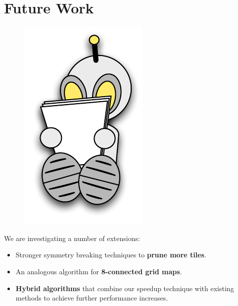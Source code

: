 \section{Future Work}
 \begin{figure}
	\vspace{-2em}
		\includegraphics[width=0.15\columnwidth]{diagrams/robot_reading.pdf}
 \end{figure}
We are investigating a number of extensions:
\begin{itemize}
\item{Stronger symmetry breaking techniques to \textbf{prune more tiles}.}
\item{An analogous algorithm for \textbf{8-connected grid maps}.
}
\item{\textbf{Hybrid algorithms} that combine our speedup technique with existing methods
to achieve further performance increases.}
\end{itemize}

